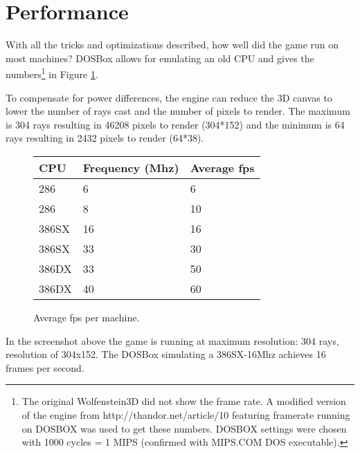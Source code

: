 \section{Performance}
With all the tricks and optimizations described, how well did the game run on most machines? DOSBox allows for emulating an old CPU and gives the numbers\footnote{The original Wolfenstein3D did not show the frame rate. A modified version of the engine from http://thandor.net/article/10 featuring framerate running on DOSBOX was used to get these numbers. DOSBOX settings were chosen with 1000 cycles = 1 MIPS (confirmed with MIPS.COM DOS executable).} in Figure \ref{perf_summary}.\\
\par

To compensate for power differences, the engine can reduce the 3D canvas to lower the number of rays cast and the number of pixels to render. The maximum is 304 rays resulting in 46208 pixels to render (304*152) and the minimum is 64 rays resulting in 2432 pixels to render (64*38).\\
\par
\begin{figure}[H]
\centering
\begin{tabularx}{\textwidth}{ X X X }
  \toprule
  \textbf{CPU} & \textbf{Frequency (Mhz)} & \textbf{Average fps} \\ \bottomrule
 286 & 6 & 6 \\
 286 & 8 & 10 \\
 386SX & 16 &  16 \\
 386SX & 33 & 30 \\
 386DX & 33 & 50 \\
 386DX & 40 & 60 \\ \bottomrule
\end{tabularx}
\caption{Average fps per machine.}
\label{perf_summary}
\end{figure}


  \begin{figure}[H]
\centering
 \end{figure}
 \par
 In the screenshot above the game is running at maximum resolution: 304 rays, resolution of 304x152. The DOSBox simulating a 386SX-16Mhz achieves 16 frames per second.

   \begin{figure}[H]
\centering
 \end{figure}
 \par

